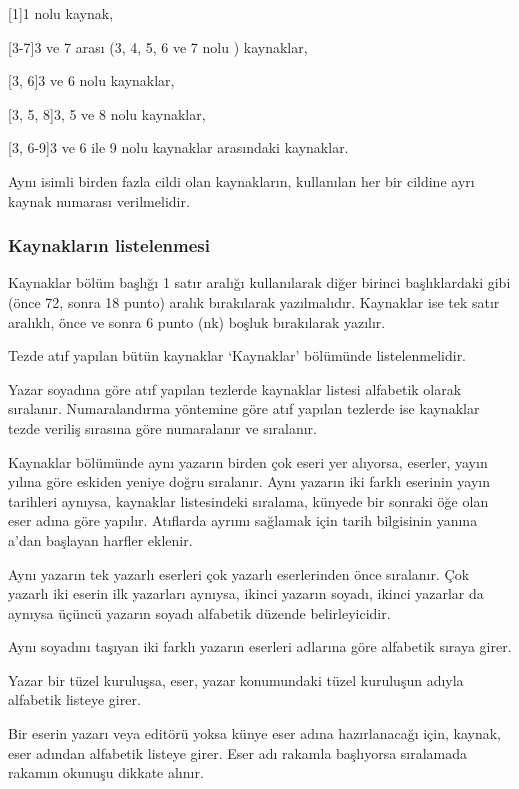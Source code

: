 [1]\quad{}\quad{}1 nolu kaynak,

[3-7]\quad{}\quad{}3 ve 7 arası (3, 4, 5, 6 ve 7 nolu ) kaynaklar,

[3, 6]\quad{}\quad{}3 ve 6 nolu kaynaklar,

[3, 5, 8]\quad{}3, 5 ve 8 nolu kaynaklar,

[3, 6-9]\quad{}3 ve 6 ile 9 nolu kaynaklar arasındaki kaynaklar.

Aynı isimli birden fazla cildi olan kaynakların, kullanılan her bir cildine ayrı kaynak numarası verilmelidir.

\subsubsection{Kaynakların listelenmesi}
Kaynaklar bölüm başlığı 1 satır aralığı kullanılarak diğer birinci başlıklardaki gibi (önce 72, sonra 18 punto) aralık bırakılarak yazılmalıdır. Kaynaklar ise tek satır aralıklı, önce ve sonra 6 punto (nk) boşluk bırakılarak yazılır.

Tezde atıf yapılan bütün kaynaklar ‘Kaynaklar’ bölümünde listelenmelidir.

Yazar soyadına göre atıf yapılan tezlerde kaynaklar listesi alfabetik olarak sıralanır. Numaralandırma yöntemine göre atıf yapılan tezlerde ise kaynaklar tezde veriliş sırasına göre numaralanır ve sıralanır.

Kaynaklar bölümünde aynı yazarın birden çok eseri yer alıyorsa, eserler, yayın yılına göre eskiden yeniye doğru sıralanır. Aynı yazarın iki farklı eserinin yayın tarihleri aynıysa, kaynaklar listesindeki sıralama, künyede bir sonraki öğe olan eser adına göre yapılır. Atıflarda ayrımı sağlamak için tarih bilgisinin yanına a’dan başlayan harfler eklenir.

Aynı yazarın tek yazarlı eserleri çok yazarlı eserlerinden önce sıralanır. Çok yazarlı iki eserin ilk yazarları aynıysa, ikinci yazarın soyadı, ikinci yazarlar da aynıysa üçüncü yazarın soyadı alfabetik düzende belirleyicidir.

Aynı soyadını taşıyan iki farklı yazarın eserleri adlarına göre alfabetik sıraya girer.

Yazar bir tüzel kuruluşsa, eser, yazar konumundaki tüzel kuruluşun adıyla alfabetik listeye girer.

Bir eserin yazarı veya editörü yoksa künye eser adına hazırlanacağı için, kaynak, eser adından alfabetik listeye girer. Eser adı rakamla başlıyorsa sıralamada rakamın okunuşu dikkate alınır.

